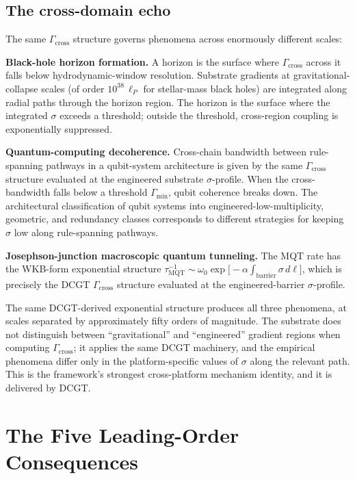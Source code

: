 \documentclass[11pt,a4paper]{article}
\begin{document}
\subsection{The cross-domain echo}

The same $\Gamma_{\mathrm{cross}}$ structure governs phenomena across enormously different scales:

\textbf{Black-hole horizon formation.} A horizon is the surface where $\Gamma_{\mathrm{cross}}$ across it falls below hydrodynamic-window resolution. Substrate gradients at gravitational-collapse scales (of order $10^{38}\, \ell_P$ for stellar-mass black holes) are integrated along radial paths through the horizon region. The horizon is the surface where the integrated $\sigma$ exceeds a threshold; outside the threshold, cross-region coupling is exponentially suppressed.

\textbf{Quantum-computing decoherence.} Cross-chain bandwidth between rule-spanning pathways in a qubit-system architecture is given by the same $\Gamma_{\mathrm{cross}}$ structure evaluated at the engineered substrate $\sigma$-profile. When the cross-bandwidth falls below a threshold $\Gamma_{\min}$, qubit coherence breaks down. The architectural classification of qubit systems into engineered-low-multiplicity, geometric, and redundancy classes corresponds to different strategies for keeping $\sigma$ low along rule-spanning pathways.

\textbf{Josephson-junction macroscopic quantum tunneling.} The MQT rate has the WKB-form exponential structure $\tau_{\mathrm{MQT}}^{-1} \sim \omega_0 \exp\bigl[-\alpha \int_{\mathrm{barrier}} \sigma\, d\ell\bigr]$, which is precisely the DCGT $\Gamma_{\mathrm{cross}}$ structure evaluated at the engineered-barrier $\sigma$-profile.

The same DCGT-derived exponential structure produces all three phenomena, at scales separated by approximately fifty orders of magnitude. The substrate does not distinguish between ``gravitational'' and ``engineered'' gradient regions when computing $\Gamma_{\mathrm{cross}}$; it applies the same DCGT machinery, and the empirical phenomena differ only in the platform-specific values of $\sigma$ along the relevant path. This is the framework's strongest cross-platform mechanism identity, and it is delivered by DCGT.

\section{The Five Leading-Order Consequences}
\end{document}
